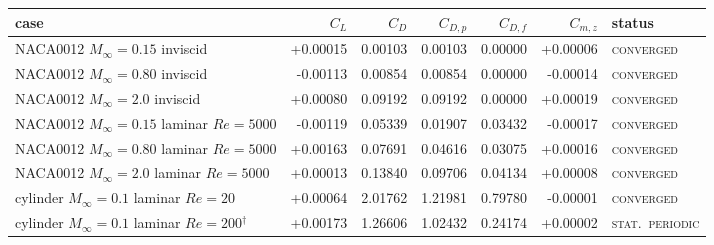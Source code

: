 \footnotesize
\begin{tabular}{lrrrrrl}
\toprule
case & $C_L$ & $C_D$ & $C_{D,p}$ & $C_{D,f}$ & $C_{m,z}$ & status\\
\midrule
NACA0012 $M_\infty=0.15$ inviscid & +0.00015 & 0.00103 & 0.00103 & 0.00000 & +0.00006 & \textsc{converged}\\
NACA0012 $M_\infty=0.80$ inviscid & -0.00113 & 0.00854 & 0.00854 & 0.00000 & -0.00014 & \textsc{converged}\\
NACA0012 $M_\infty=2.0$ inviscid & +0.00080 & 0.09192 & 0.09192 & 0.00000 & +0.00019 & \textsc{converged}\\
NACA0012 $M_\infty=0.15$ laminar $Re=5000$ & -0.00119 & 0.05339 & 0.01907 & 0.03432 & -0.00017 & \textsc{converged}\\
NACA0012 $M_\infty=0.80$ laminar $Re=5000$ & +0.00163 & 0.07691 & 0.04616 & 0.03075 & +0.00016 & \textsc{converged}\\
NACA0012 $M_\infty=2.0$ laminar $Re=5000$ & +0.00013 & 0.13840 & 0.09706 & 0.04134 & +0.00008 & \textsc{converged}\\
cylinder $M_\infty=0.1$ laminar $Re=20$ & +0.00064 & 2.01762 & 1.21981 & 0.79780 & -0.00001 & \textsc{converged}\\
cylinder $M_\infty=0.1$ laminar $Re=200$$^{\dagger}$ & +0.00173 & 1.26606 & 1.02432 & 0.24174 & +0.00002 & \textsc{stat.\ periodic}\\
\bottomrule
\end{tabular}
